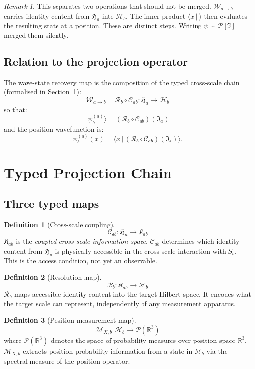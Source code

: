 \documentclass[12pt, a4paper]{article}
\theoremstyle{definition}
\newtheorem{defn}{Definition}[section]
\theoremstyle{plain}
\theoremstyle{remark}
\newtheorem{remark}{Remark}[section]
\newcommand{\Ia}{\mathfrak{I}_a}
\newcommand{\Ha}{\mathfrak{H}_a}        %
\newcommand{\Hb}{\mathcal{H}_b}         %
\newcommand{\Kab}{\mathfrak{K}_{ab}}    %
\newcommand{\ProbR}{\mathcal{P}(\mathbb{R}^3)} %
\newcommand{\Sb}{S_b}
\newcommand{\Wab}{\mathcal{W}_{a\to b}}   %
\newcommand{\Cab}{\mathcal{C}_{ab}}        %
\newcommand{\Rb}{\mathcal{R}_b}            %
\newcommand{\MXb}{\mathcal{M}_{X,b}}      %
\newcommand{\psix}{\psi_b^{(a)}(x)}
\begin{document}
\begin{remark}
This separates two operations that should not be merged.
$\Wab$ carries identity content from $\Ha$ into $\Hb$.
The inner product $\langle x\,|\cdot\rangle$ then evaluates the
resulting state at a position.
These are distinct steps.
Writing $\psi \sim \mathcal{P}[\mathfrak{I}]$ merged them silently.
\end{remark}

\subsection{Relation to the projection operator}

The wave-state recovery map is the composition of the typed
cross-scale chain (formalised in Section~\ref{sec:typedchain}):
\[
  \boxed{\Wab = \Rb \circ \Cab : \Ha \to \Hb}
\]
so that:
\[
  |\psi_b^{(a)}\rangle
  = (\Rb \circ \Cab)(\Ia)
\]
and the position wavefunction is:
\[
  \psix = \langle x\,|\,(\Rb \circ \Cab)(\Ia)\rangle.
\]


\section{Typed Projection Chain}
\label{sec:typedchain}

\subsection{Three typed maps}

\begin{defn}[Cross-scale coupling]
\label{def:Cab}
\[
  \boxed{\Cab : \Ha \to \Kab}
\]
$\Kab$ is the \emph{coupled cross-scale information space}.
$\Cab$ determines which identity content from $\Ha$ is physically
accessible in the cross-scale interaction with $\Sb$.
This is the access condition, not yet an observable.
\end{defn}

\begin{defn}[Resolution map]
\label{def:Rb}
\[
  \boxed{\Rb : \Kab \to \Hb}
\]
$\Rb$ maps accessible identity content into the target Hilbert space.
It encodes what the target scale can represent, independently of any
measurement apparatus.
\end{defn}

\begin{defn}[Position measurement map]
\label{def:MXb}
\[
  \boxed{\MXb : \Hb \to \ProbR}
\]
where $\ProbR$ denotes the space of probability measures over
position space $\mathbb{R}^3$.
$\MXb$ extracts position probability information from a state
in $\Hb$ via the spectral measure of the position operator.
\end{defn}
\end{document}
